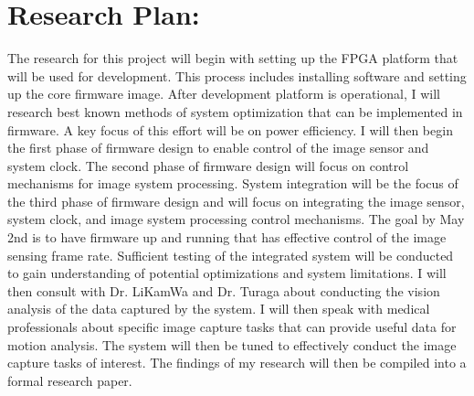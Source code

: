 \section{Research Plan:}

\indent The research for this project will begin with setting up the FPGA platform that will be used for development.
This process includes installing software and setting up the core firmware image. After development platform is
operational, I will research best known methods of system optimization that can be implemented in firmware. A key
focus of this effort will be on power efficiency. I will then begin the first phase of firmware design to enable control
of the image sensor and system clock. The second phase of firmware design will focus on control mechanisms for image system
processing. System integration will be the focus of the third phase of firmware design and will focus on integrating the
image sensor, system clock, and image system processing control mechanisms. The goal by May 2nd is to have firmware up
and running that has effective control of the image sensing frame rate. Sufficient testing of the integrated system will be
conducted to gain understanding of potential optimizations and system limitations. I will then consult with Dr. LiKamWa and Dr.
Turaga about conducting the vision analysis of the data captured by the system. I will then speak with medical professionals
about specific image capture tasks that can provide useful data for motion analysis. The system will then be tuned to
effectively conduct the image capture tasks of interest. The findings of my research will then be compiled into a formal
research paper.
